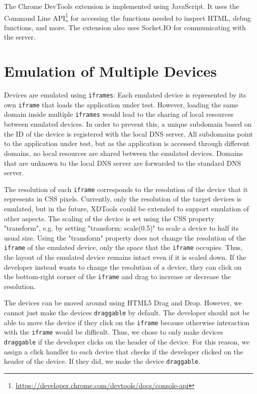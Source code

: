 The Chrome DevTools extension is implemented using JavaScript. It uses the Command Line API\footnote{\url{https://developer.chrome.com/devtools/docs/console-api}} for accessing the functions needed to inspect HTML, debug functions, and more. The extension also uses Socket.IO for communicating with the server. 

\section{Emulation of Multiple Devices}

Devices are emulated using \lstinline|iframes|: Each emulated device is represented by its own \lstinline|iframe| that loads the application under test. However, loading the same domain inside multiple \lstinline|iframes| would lead to the sharing of local resources between emulated devices.  In order to prevent this, a unique subdomain based on the ID of the device is registered with the local DNS server. All subdomains point to the application under test, but as the application is accessed through different domains, no local resources are shared between the emulated devices. Domains that are unknown to the local DNS server are forwarded to the standard DNS server. 

The resolution of each \lstinline|iframe| corresponds to the resolution of the device that it represents in CSS pixels. Currently, only the resolution of the target devices is emulated, but in the future, XDTools could be extended to support emulation of other aspects. The scaling of the device is set using the CSS property "transform", e.g. by setting "transform: scale(0.5)" to scale a device to half its usual size. Using the "transform" property does not change the resolution of the \lstinline|iframe| of the emulated device, only the space that the \lstinline|iframe| occupies. Thus, the layout of the emulated device remains intact even if it is scaled down. If the developer instead wants to change the resolution of a device, they can click on the bottom-right corner of the \lstinline|iframe| and drag to increase or decrease the resolution. 

The devices can be moved around using HTML5 Drag and Drop. However, we cannot just make the devices \lstinline|draggable| by default. The developer should not be able to move the device if they click on the \lstinline|iframe| because otherwise interaction with the \lstinline|iframe| would be difficult. Thus, we chose to only make devices \lstinline|draggable| if the developer clicks on the header of the device. For this reason, we assign a click handler to each device that checks if the developer clicked on the header of the device. If they did, we make the device \lstinline|draggable|. 


